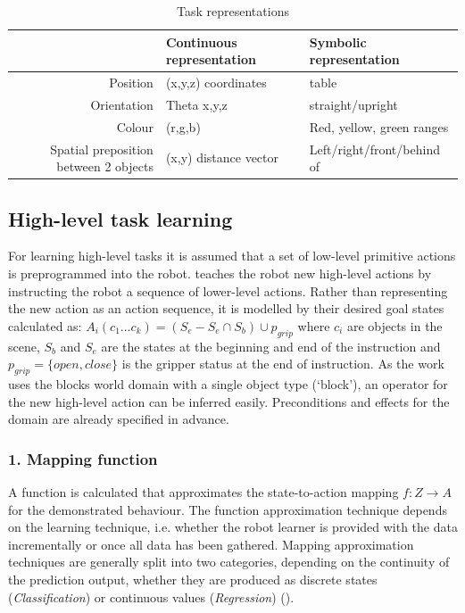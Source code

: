 \begin{table}[ht]
\centering
\caption{Task representations}
\label{tab:representations}
\begin{tabular}{r|ll}
 & Continuous representation & Symbolic representation\\ \hline
Position & (x,y,z) coordinates & table \\
Orientation  & Theta x,y,z  & straight/upright \\
Colour & (r,g,b) & Red, yellow, green ranges\\
Spatial preposition between 2 objects & (x,y) distance vector & Left/right/front/behind of 
\end{tabular}
\end{table}

\subsection{High-level task learning}
For learning high-level tasks it is assumed that a set of low-level primitive actions is preprogrammed into the robot. 
\cite{she2014teaching} teaches the robot new high-level actions by instructing the robot a sequence of lower-level actions.
Rather than representing the new action as an action sequence, it is modelled by their desired goal states calculated as:
$A_i(c_1 \dots c_k) = (S_e - S_e \cap S_b) \cup p_{grip}$ where $c_i$ are objects in the scene, $S_b$ and $S_e$ are the states at the beginning and end of the instruction and $p_{grip} = \{open, close\}$ is the gripper status at the end of instruction.
As the work uses the blocks world domain with a single object type (`block'), an operator for the new high-level action can be inferred easily. Preconditions and effects for the domain are already specified in advance.


\subsubsection{1. Mapping function} 
A function is calculated that approximates the state-to-action mapping $f : Z \rightarrow A$ for the demonstrated behaviour. The function approximation technique depends on the learning technique, i.e. whether the robot learner is provided with the data incrementally or once all data has been gathered. Mapping approximation techniques are generally split into two categories, depending on the continuity of the prediction output, whether they are produced as discrete states (\textit{Classification}) or continuous values (\textit{Regression}) (\cite{argall2009survey}).

